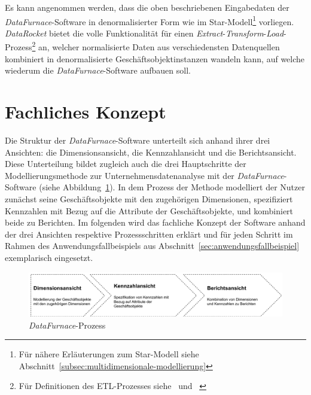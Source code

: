 \documentclass[
  language=german, %
  type=bachelor,%
  ngerman
]{isthesis}
\begin{document}
\begin{content}
\begin{enumerate}
			Es kann angenommen werden, dass die oben beschriebenen Eingabedaten der
			\textit{DataFurnace}-Software in denormalisierter Form wie im
			Star-Modell\footnote{Für nähere Erläuterungen zum Star-Modell siehe
			Abschnitt~\ref{subsec:multidimensionale-modellierung}} vorliegen.
			\textit{DataRocket} bietet die volle Funktionalität für einen
			\textit{Extract}-\textit{Transform}-\textit{Load}-Prozess\footnote{Für
			Definitionen des ETL-Prozesses
			siehe~\textsc{\citeauthor{vassiliadis2002conceptual}}
			\citeyearpar{vassiliadis2002conceptual}
			und~\textsc{\citeauthor{trujillo2003uml}} \citeyearpar{trujillo2003uml}}
			an, welcher normalisierte Daten aus verschiedensten Datenquellen
			kombiniert in denormalisierte Geschäftsobjektinstanzen wandeln kann, auf
			welche wiederum die \textit{DataFurnace}-Software aufbauen soll.

  \end{enumerate}



  \section{Fachliches Konzept}\label{sec:sprache/fachliches-konzept}

  Die Struktur der \textit{DataFurnace}-Software unterteilt sich anhand ihrer
  drei Ansichten: die Dimensionsansicht, die Kennzahlansicht und die
  Berichtsansicht. Diese Unterteilung bildet zugleich auch die drei
  Hauptschritte der Modellierungsmethode zur Unternehmensdatenanalyse mit der
  \textit{DataFurnace}-Software (siehe Abbildung~\ref{datafurnace-prozess}). In
  dem Prozess der Methode modelliert der Nutzer zunächst seine Geschäftsobjekte
  mit den zugehörigen Dimensionen, spezifiziert Kennzahlen mit Bezug auf die
  Attribute der Geschäftsobjekte, und kombiniert beide zu Berichten. Im
  folgenden wird das fachliche Konzept der Software anhand der drei Ansichten
  respektive Prozessschritten erklärt und für jeden Schritt im Rahmen des
  Anwendungsfallbeispiels aus Abschnitt~\ref{sec:anwendungsfallbeispiel}
  exemplarisch eingesetzt.

  \begin{figure}
    \includegraphics[scale=0.60]{content/figures/datafurnace-process}
    \caption{\textit{DataFurnace}-Prozess}\label{datafurnace-prozess}
  \end{figure}


\end{content}
\end{document}

